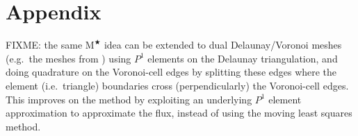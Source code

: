 \documentclass[twocolumn,letterpaper]{igs}
\newcommand{\Mstar}{$\text{M}^{\bigstar}$\xspace}
\begin{document}



\appendix
\section{Appendix}  \label{sec:app}

FIXME: the same \Mstar idea can be extended to dual Delaunay/Voronoi meshes (e.g.~the meshes from \cite{EgholmNielsen2010,Ringleretal2013}) using $P^1$ elements on the Delaunay triangulation, and doing quadrature on the Voronoi-cell edges by splitting these edges where the element (i.e.~triangle) boundaries cross (perpendicularly) the Voronoi-cell edges.  This improves on the \cite{EgholmNielsen2010} method by exploiting an underlying $P^1$ element approximation to approximate the flux, instead of using the moving least squares method.


\begin{comment}
Here is what the MPAS Land-Ice User's Manual version 3.0 says:

\begin{quote}
\small
Velocities and fluxes are calculated on the midpoint of Voronoi cell edges.  The normal component of surface slope is calculated on cell edges using surface elevation at adjacent cell centers.  The tangential component of surface slope is calculated on cell edges using surface elevation at adjacent vertices. The surface elevation at vertices is calculated from the values at adjacent cell centers using barycentric interpolation. Ice thickness on edges is calculated as the average of the adjacent cell center values (2nd-order approximation).
\end{quote}

Looking at this, and the code, I don't think they think of it as Petrov-Galerkin
\end{comment}
\end{document}
